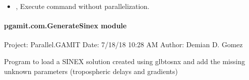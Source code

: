 \documentclass[letterpaper,10pt,english]{sphinxmanual}
\begin{document}
\begin{itemize}
\item {} 
\sphinxAtStartPar
{\hyperref[\detokenize{pgamit.com:GenerateKml.py--np}]{}}, {\hyperref[\detokenize{pgamit.com:GenerateKml.py---noparallel}]{}} \sphinxhyphen{} Execute command without parallelization.

\end{itemize}


\paragraph{pgamit.com.GenerateSinex module}
\label{\detokenize{pgamit.com:module-pgamit.com.GenerateSinex}}\label{\detokenize{pgamit.com:pgamit-com-generatesinex-module}}
\sphinxAtStartPar
Project: Parallel.GAMIT
Date: 7/18/18 10:28 AM
Author: Demian D. Gomez

\sphinxAtStartPar
Program to load a SINEX solution created using glbtosnx and add the missing unknown parameters (tropospheric delays
and gradients)

\begin{fulllineitems}
\label{\detokenize{pgamit.com:pgamit.com.GenerateSinex.add_domes}}
\pysigstartsignatures
\pysiglinewithargsret
{}
{\sphinxparamcomma {}}
{}
\pysigstopsignatures
\end{fulllineitems}


\begin{fulllineitems}
\label{\detokenize{pgamit.com:pgamit.com.GenerateSinex.main}}
\pysigstartsignatures
\pysiglinewithargsret
{}
{}
{}
\pysigstopsignatures
\end{fulllineitems}

\end{document}
